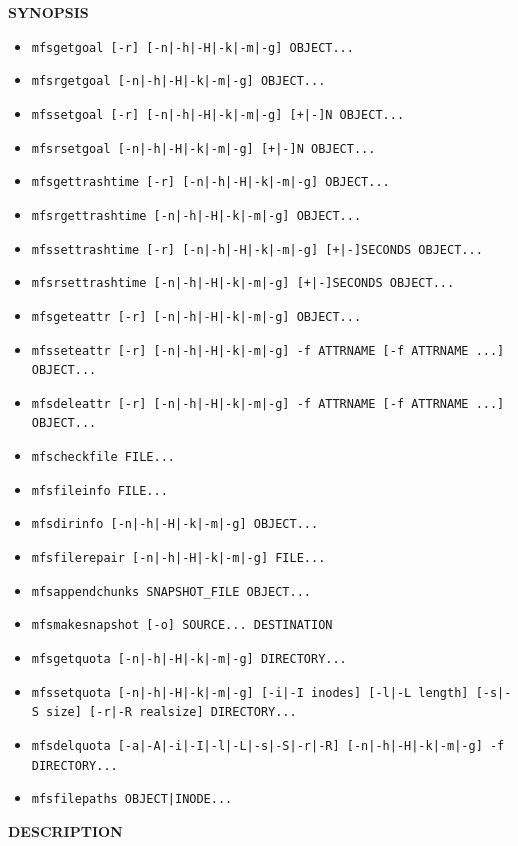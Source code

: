 \documentclass[a4paper,11pt,english]{report}
\def\code#1{\texttt{#1}}
\begin{document}
				\textbf{SYNOPSIS}
				\begin{itemize}
					\item \code{mfsgetgoal [-r] [-n|-h|-H|-k|-m|-g] OBJECT...}
					\item \code{mfsrgetgoal [-n|-h|-H|-k|-m|-g] OBJECT...}
					\item \code{mfssetgoal [-r] [-n|-h|-H|-k|-m|-g] [+|-]N OBJECT...}
					\item \code{mfsrsetgoal [-n|-h|-H|-k|-m|-g] [+|-]N OBJECT...}
					\item \code{mfsgettrashtime [-r] [-n|-h|-H|-k|-m|-g] OBJECT...}
					\item \code{mfsrgettrashtime [-n|-h|-H|-k|-m|-g] OBJECT...}
					\item \code{mfssettrashtime [-r] [-n|-h|-H|-k|-m|-g] [+|-]SECONDS OBJECT...}
					\item \code{mfsrsettrashtime [-n|-h|-H|-k|-m|-g] [+|-]SECONDS OBJECT...}
					\item \code{mfsgeteattr [-r] [-n|-h|-H|-k|-m|-g] OBJECT...}
					\item \code{mfsseteattr  [-r]  [-n|-h|-H|-k|-m|-g]  -f  ATTRNAME  [-f ATTRNAME ...] OBJECT...}
					\item \code{mfsdeleattr [-r] [-n|-h|-H|-k|-m|-g]  -f  ATTRNAME  [-f  ATTRNAME  ...] OBJECT...}
					\item \code{mfscheckfile FILE...}
					\item \code{mfsfileinfo FILE...}
					\item \code{mfsdirinfo [-n|-h|-H|-k|-m|-g] OBJECT...}
					\item \code{mfsfilerepair [-n|-h|-H|-k|-m|-g] FILE...}
					\item \code{mfsappendchunks SNAPSHOT\_FILE OBJECT...}
					\item \code{mfsmakesnapshot [-o] SOURCE... DESTINATION}
					\item \code{mfsgetquota [-n|-h|-H|-k|-m|-g] DIRECTORY...}
					\item \code{mfssetquota  [-n|-h|-H|-k|-m|-g]  [-i|-I  inodes] [-l|-L length]
								[-s|-S size] [-r|-R realsize] DIRECTORY...}
					\item \code{mfsdelquota  [-a|-A|-i|-I|-l|-L|-s|-S|-r|-R]   [-n|-h|-H|-k|-m|-g]
								-f DIRECTORY...}
					\item \code{mfsfilepaths OBJECT|INODE...}
				\end{itemize}
				\bigskip
				
				\textbf{DESCRIPTION}
				
\end{document}
